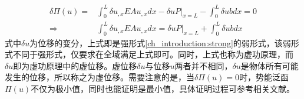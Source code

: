 \begin{subequations}\label{ch_energy:weak}
\begin{align}
    \delta \Pi(u) = &\int_0^L \delta u_{,x} EA u_{,x} dx - \delta u P \vert_{x=L} - \int_0^L \delta u b dx = 0 \\
    \Rightarrow &\int_0^L \delta u_{,x} EA u_{,x} dx = \delta u P \vert_{x=L} + \int_0^L \delta u b dx
\end{align}
\end{subequations}
式中$\delta u$为位移的变分，上式即是强形式\eqref{ch_introduction:strong}的弱形式，该弱形式不同于强形式，仅要求在全域满足上式即可。同时，上式也称为虚功原理，而$\delta u$即为虚功原理中的虚位移。虚位移$\delta u$与位移$u$两者并不相同，$\delta u$是物体所有可能发生的位移，所以称之为虚位移。需要注意的是，当$\delta \Pi(u)=0$时，势能泛函$\Pi(u)$不仅为极小值，同时也能证明是最小值，具体证明过程可参考相关文献。

